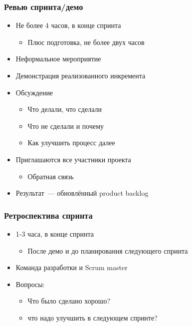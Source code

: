 \documentclass{../../slides-style}
\begin{document}
    \begin{frame}
        \frametitle{Ревью спринта/демо}
        \begin{itemize}
            \item Не более 4 часов, в конце спринта
            \begin{itemize}
                \item Плюс подготовка, не более двух часов
            \end{itemize}
            \item Неформальное мероприятие
            \item Демонстрация реализованного инкремента
            \item Обсуждение
            \begin{itemize}
                \item Что делали, что сделали
                \item Что не сделали и почему
                \item Как улучшить процесс далее
            \end{itemize}
            \item Приглашаются все участники проекта
            \begin{itemize}
                \item Обратная связь
            \end{itemize}
            \item Результат~--- обновлённый product backlog
        \end{itemize}
    \end{frame}

    \begin{frame}
        \frametitle{Ретроспектива спринта}
        \begin{itemize}
            \item 1-3 часа, в конце спринта
            \begin{itemize}
                \item После демо и до планирования следующего спринта
            \end{itemize}
            \item Команда разработки и Scrum master
            \item Вопросы:
            \begin{itemize}
                \item Что было сделано хорошо?
                \item что надо улучшить в следующем спринте?
            \end{itemize}
        \end{itemize}
    \end{frame}
\end{document}
